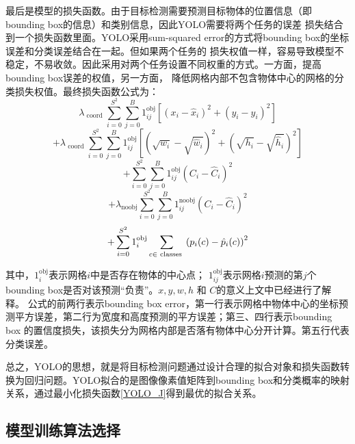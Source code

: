  
最后是模型的损失函数。由于目标检测需要预测目标物体的位置信息（即bounding box的信息）和类别信息，因此YOLO需要将两个任务的误差
损失结合到一个损失函数里面。YOLO采用sum-squared error的方式将bounding box的坐标误差和分类误差结合在一起。但如果两个任务的
损失权值一样，容易导致模型不稳定，不易收敛。因此采用对两个任务设置不同权重的方式。一方面，提高bounding box误差的权值，另一方面，
降低网格内部不包含物体中心的网格的分类损失权值。最终损失函数公式为：
$$\lambda _ { \text { coord } } \sum _ { i = 0 } ^ { S ^ { 2 } } \sum _ { j = 0 } ^ { B } 1 _ { i j } ^ { \mathrm { obj } } \left[ \left( x _ { i } - \hat { x } _ { i } \right) ^ { 2 } + \left( y _ { i } - \hat { y } _ { i } \right) ^ { 2 } \right]$$
$$+ \lambda _ { \text { coord } } \sum _ { i = 0 } ^ { S ^ { 2 } } \sum _ { j = 0 } ^ { B } 1 _ { i j } ^ { \mathrm { obj } } \left[ \left( \sqrt { w _ { i } } - \sqrt { \hat { w } _ { i } } \right) ^ { 2 } + \left( \sqrt { h _ { i } } - \sqrt { \hat { h } _ { i } } \right) ^ { 2 } \right]$$
$$+ \sum _ { i = 0 } ^ { S ^ { 2 } } \sum _ { j = 0 } ^ { B } 1 _ { i j } ^ { \mathrm { obj } } \left( C _ { i } - \hat { C } _ { i } \right) ^ { 2 }$$
$$+ \lambda _ { \mathrm { noobj } } \sum _ { i = 0 } ^ { S ^ { 2 } } \sum _ { j = 0 } ^ { B } 1 _ { i j } ^ { \mathrm { noobj } } \left( C _ { i } - \hat { C } _ { i } \right) ^ { 2 }$$
\begin{equation}
    \centering
    + \sum _ { i = 0 } ^ { S ^ { 2 } } 1 _ { i } ^ { \mathrm { obj } } \sum _ { c \in \text { classes } } \left( p _ { i } ( c ) - \hat { p } _ { i } ( c ) \right) ^ { 2 }
    \label{YOLO_J}
\end{equation}

其中，$1 _ { i } ^ { \mathrm { obj } }$表示网格$i$中是否存在物体的中心点； $1 _ { i j } ^ { \mathrm { obj } }$表示网格$i$预测的第$j$个
bounding box是否对该预测“负责”。$x , y , w , h$ 和 $C$的意义上文中已经进行了解释。
公式的前两行表示bounding box error，第一行表示网格中物体中心的坐标预测平方误差，第二行为宽度和高度预测的平方误差；第三、四行表示bounding box
的置信度损失，该损失分为网格内部是否落有物体中心分开计算。第五行代表分类误差。

总之，YOLO的思想，就是将目标检测问题通过设计合理的拟合对象和损失函数转换为回归问题。YOLO拟合的是图像像素值矩阵到bounding box和分类概率的映射
关系，通过最小化损失函数\ref{YOLO_J}得到最优的拟合关系。

\subsection{模型训练算法选择}

